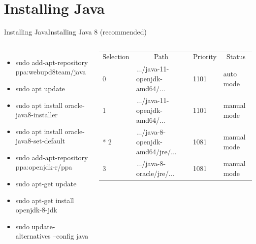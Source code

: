 \documentclass[aspectratio=1610,english]{beamer} %
\newcommand{\centerheading}[1]{\multicolumn{1}{c}{#1}}
\begin{document}
  	\section{Installing Java}
	\begin{frame}{Installing Java}{Installing Java 8 (recommended)}
		\begin{columns}
				\begin{itemize}
					\small
					\item sudo add-apt-repository \\ ppa:webupd8team/java
					\item sudo apt update
					\item sudo apt install oracle-java8-installer
					\item sudo apt install oracle-java8-set-default
					\item sudo add-apt-repository \\ ppa:openjdk-r/ppa
					\item sudo apt-get update 
					\item sudo apt-get install openjdk-8-jdk
					\item sudo update-alternatives --config java
				\end{itemize}

				\fontsize{3}{5} \selectfont
				\begin{tabularx}{0.8\textwidth}{m{2em} m{15em} m{2em} m{7em}}
					\hline
						\centerheading{Selection} 
						& \centerheading{Path} 
						& \centerheading{Priority} 
						& \centerheading{Status} \\
						0 & .../java-11-openjdk-amd64/... & 1101 & auto mode \\
						1 & .../java-11-openjdk-amd64/... & 1101 & manual mode \\
						* 2 & .../java-8-openjdk-amd64/jre/... & 1081 & manual mode \\
						3 & .../java-8-oracle/jre/... & 1081 & manual mode \\

\end{tabularx}
\end{columns}
\end{frame}
\end{document}
